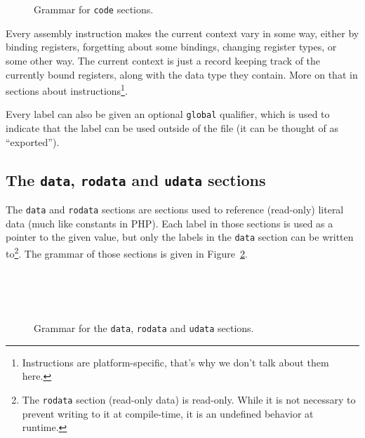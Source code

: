 \begin{figure}[htb]
  \centering
  \\
  \\

  \caption{Grammar for \texttt{code} sections.}
  \label{fig:nstar-common-sections-code-grammar}
\end{figure}

Every assembly instruction makes the current context vary in some way, either by binding registers, forgetting about some bindings, changing register types, or some other way. The current context is just a record keeping track of the currently bound registers, along with the data type they contain.
More on that in sections about instructions\footnote{Instructions are platform-specific, that's why we don't talk about them here.}.

Every label can also be given an optional \texttt{global} qualifier, which is used to indicate that the label can be used outside of the file (it can be thought of as ``exported'').

\subsection{The \texttt{data}, \texttt{rodata} and \texttt{udata} sections}\label{subsec:nstar-common-sections-data}

The \texttt{data} and \texttt{rodata} sections are sections used to reference (read-only) literal data (much like constants in PHP).
Each label in those sections is used as a pointer to the given value, but only the labels in the \texttt{data} section can be written to\footnote{The \texttt{rodata} section (read-only data) is read-only. While it is not necessary to prevent writing to it at compile-time, it is an undefined behavior at runtime.}.
The grammar of those sections is given in Figure~\ref{fig:nstar-common-sections-data-grammar}.

\begin{figure}[htb]
  \centering
  \\
  \\
  \\

  \caption{Grammar for the \texttt{data}, \texttt{rodata} and \texttt{udata} sections.}
  \label{fig:nstar-common-sections-data-grammar}
\end{figure}

